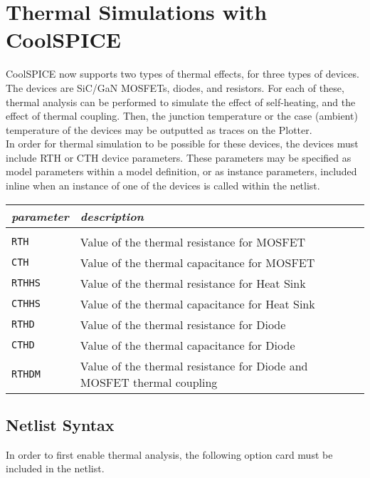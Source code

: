\chapter{Thermal Simulations with CoolSPICE}

\label{chap_thermalsimulations_tas}

CoolSPICE now supports two types of thermal effects, for three types of devices. The devices are SiC/GaN MOSFETs, diodes, and resistors. 
For each of these, thermal analysis can be performed to simulate the effect of self-heating, and the effect of thermal coupling. 
Then, the junction temperature or the case (ambient) temperature of the devices may be outputted as traces on the Plotter. \\

In order for thermal simulation to be possible for these devices, the devices must include RTH or CTH device parameters. These parameters may 
be specified as model parameters within a model definition, or as instance parameters, included inline when an instance of one of the devices
is called within the netlist. \\

\begin{tabular}{l l}
\textit{parameter} & \textit{description} \\ \hline \\ \vspace{-0.8\parskip}
\texttt{RTH} & Value of the thermal resistance for MOSFET \\
\texttt{CTH} & Value of the thermal capacitance for MOSFET \\
\texttt{RTHHS} & Value of the thermal resistance for Heat Sink \\
\texttt{CTHHS} & Value of the thermal capacitance for Heat Sink \\
\texttt{RTHD} & Value of the thermal resistance for Diode \\
\texttt{CTHD} & Value of the thermal capacitance for Diode \\
\texttt{RTHDM} & Value of the thermal resistance for Diode and MOSFET thermal coupling \\
\end{tabular}

\section{Netlist Syntax}
\label{subsec_sceadm_thermalnetsyntax}

In order to first enable thermal analysis, the following option card must be included in the netlist.

